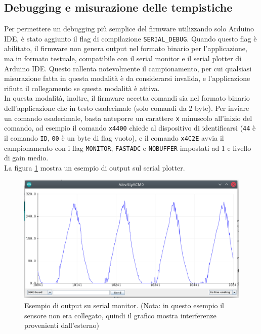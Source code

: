 \subsection{Debugging e misurazione delle tempistiche}
Per permettere un debugging più semplice del firmware utilizzando solo Arduino IDE, è stato aggiunto il flag di compilazione \texttt{SERIAL\_DEBUG}. Quando questo flag è abilitato, il firmware non genera output nel formato binario per l'applicazione, ma in formato testuale, compatibile con il serial monitor e il serial plotter di Arduino IDE. Questo rallenta notevolmente il campionamento, per cui qualsiasi misurazione fatta in questa modalità è da considerarsi invalida, e l'applicazione rifiuta il collegamento se questa modalità è attiva.\\
In questa modalità, inoltre, il firmware accetta comandi sia nel formato binario dell'applicazione che in testo esadecimale (solo comandi da 2 byte). Per inviare un comando esadecimale, basta anteporre un carattere \texttt{x} minuscolo all'inizio del comando, ad esempio il comando \texttt{x4400} chiede al dispositivo di identificarsi (\texttt{44} è il comando \texttt{ID}, \texttt{00} è un byte di flag vuoto), e il comando \texttt{x4C2E} avvia il campionamento con i flag \texttt{MONITOR}, \texttt{FASTADC} e \texttt{NOBUFFER} impostati ad 1 e livello di gain medio.\\
La figura \ref{fig:serialdebug} mostra un esempio di output sul serial plotter.

\begin{figure}[h]
	\centering
	\includegraphics[width=\textwidth]{Dispositivo_files/serialdebug.png}
	\caption{Esempio di output su serial monitor. (Nota: in questo esempio il sensore non era collegato, quindi il grafico mostra interferenze provenienti dall'esterno)}
	\label{fig:serialdebug}
\end{figure}

